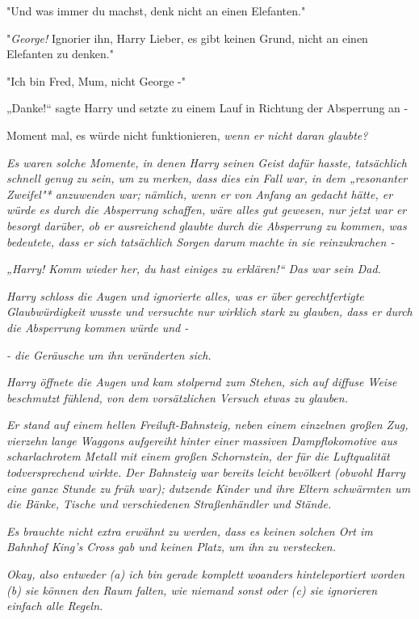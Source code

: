 {"Und was immer du machst, denk nicht an einen Elefanten."

"\emph{George!} Ignorier ihn, Harry Lieber, es gibt keinen Grund, nicht an einen Elefanten zu denken."

"Ich bin Fred, Mum, nicht George -"

„Danke!“ sagte Harry und setzte zu einem Lauf in Richtung der Absperrung an -

Moment mal, es würde nicht funktionieren, \emph{wenn er nicht daran glaubte?}

\emph{Es waren solche Momente, in denen Harry seinen Geist dafür hasste, tatsächlich schnell genug zu sein, um zu merken, dass dies ein Fall war, in dem „resonanter Zweifel"* anzuwenden war; nämlich, wenn er von Anfang an gedacht hätte, er würde es durch die Absperrung schaffen, wäre alles gut gewesen, nur jetzt war er besorgt darüber, ob er ausreichend} \emph{\emph{glaubte}} \emph{durch die Absperrung zu kommen, was bedeutete, dass er sich tatsächlich Sorgen darum} \emph{\emph{machte}} \emph{in sie reinzukrachen -}

\emph{„\emph{Harry! Komm wieder her, du hast einiges zu erklären!}“ Das war sein Dad.}

\emph{Harry schloss die Augen und ignorierte alles, was er über gerechtfertigte Glaubwürdigkeit wusste und versuchte nur} \emph{\emph{wirklich stark}} \emph{zu glauben, dass er durch die Absperrung kommen würde und -}

\emph{- die Geräusche um ihn veränderten sich.}

\emph{Harry öffnete die Augen und kam stolpernd zum Stehen, sich auf diffuse Weise beschmutzt fühlend, von dem vorsätzlichen Versuch etwas zu glauben.}

\emph{Er stand auf einem hellen Freiluft-Bahnsteig, neben einem einzelnen großen Zug, vierzehn lange Waggons aufgereiht hinter einer massiven Dampflokomotive aus scharlachrotem Metall mit einem großen Schornstein, der für die Luftqualität todversprechend wirkte. Der Bahnsteig war bereits leicht bevölkert (obwohl Harry eine ganze Stunde zu früh war); dutzende Kinder und ihre Eltern schwärmten um die Bänke, Tische und verschiedenen Straßenhändler und Stände.}

\emph{Es brauchte nicht extra erwähnt zu werden, dass es keinen solchen Ort im Bahnhof King's Cross gab und keinen Platz, um ihn zu verstecken.}

\emph{\emph{Okay, also entweder (a) ich bin gerade komplett woanders hinteleportiert worden (b) sie können den Raum falten, wie niemand sonst oder (c) sie ignorieren einfach alle Regeln.}}

}
